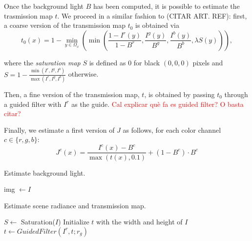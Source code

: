 \documentclass[twocolumn,twoside,a4paper,10pt]{IEEEtran}
\newcommand{\Frank}[1]{\textcolor{red}{#1}}
\begin{document}
Once the background light \(B\) has been computed, it is possible to estimate the trasmission map \(t\). We proceed in a similar fashion to (CITAR ART. REF): first, a coarse version of the transmission map \(t_0\) is obtained via
\[
  t_0(x) = 1 - \min_{y\in\Omega_x}\left(\min\left(\frac{1-I^r(y)}{1-B^r}, \frac{I^g(y)}{B^g}, \frac{I^b(y)}{B^b}, \lambda S(y)\right)\right)
,\]

where the \textit{saturation map} \(S\) is defined as \(0\) for black \((0, 0, 0)\) pixels and \(S=1-\frac{\min(I^r, I^g, I^b)}{\max(I^r, I^g, I^b)}\) otherwise.

Then, a fine version of the transmission map, \(t\), is obtained by passing \(t_0\) through a guided filter with \(I^r\) as the guide. \Frank{Cal explicar què fa es guided filter? O basta citar?}

Finally, we estimate a first version of \(J\) as follows, for each color channel \(c\in\{r, g, b\}\):
\begin{equation}\label{eq:J0}
  J^c(x) = \frac{I^c(x) - B^c}{\max(t(x), 0.1)} + (1-B^c)\cdot B^c
\end{equation}

\begin{algorithm}\label{al:background-light}
\caption{Estimate background light.}

img \(\gets I\)\;
\end{algorithm}

\begin{algorithm}\label{al:I1}
\caption{Estimate scene radiance and transmission map.}

\(S\gets \) Saturation(\(I\))\;
Initialize \(t\) with the width and height of \(I\)\;
\(t \gets GuidedFilter(I^r, t; r_g)\)\;

\end{algorithm}
\end{document}
